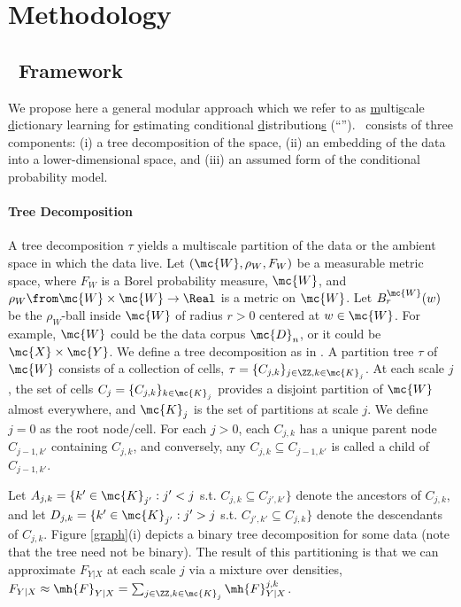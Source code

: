 \section{Methodology} \label{sec:method}

\subsection{\msd~Framework}

We propose here a general modular approach which we refer to as \uline{m}ulti\uline{s}cale \uline{d}ictionary learning for \uline{e}stimating conditional \uline{d}istribution\uline{s} (``\msd''). \msd~consists of three components: (i) a tree decomposition of the space, (ii) an embedding of the data into a lower-dimensional space,  and (iii) an assumed form of the conditional probability model. 

\paragraph{Tree Decomposition}
A tree decomposition $\tau$ yields a multiscale partition of the data or the ambient space in which the data live.
Let $(\mc{W},\rho_W, F_W)$ be a measurable metric space, where $F_W$ is a Borel probability measure, $\mc{W}$, and $\rho_W \from \mc{W} \times \mc{W} \to \Real$ is a metric on $\mc{W}$.  Let $B_r^{\mc{W}}(w)$ be the $\rho_W$-ball inside $\mc{W}$ of radius $r > 0$ centered at $w \in \mc{W}$. For example, $\mc{W}$ could be the data corpus $\mc{D}_n$, or it could be $\mc{X} \times \mc{Y}$. We define a tree decomposition as in \cite{Allard2012,ChenMaggioni12}.  A partition tree $\tau$ of $\mc{W}$ consists of a collection of cells, $\tau=\{C_{j,k}\}_{j \in \ZZ, k \in \mc{K}_j}$.  At each scale $j$, the set of cells $C_j=\{C_{j,k}\}_{k \in \mc{K}_j}$ provides a disjoint partition of $\mc{W}$ almost everywhere, and $\mc{K}_j$ is the set of partitions at scale $j$.  We define $j=0$ as the root node/cell.  For each $j > 0$,  each $C_{j,k}$ has a unique parent node $C_{j-1,k'}$ containing $C_{j,k}$, and conversely, any $C_{j,k} \subseteq C_{j-1,k'}$ is called a child of $C_{j-1,k'}$.



Let $A_{j,k}=\{k' \in \mc{K}_{j'} : j' < j$ s.t. $C_{j,k} \subseteq C_{j',k'}\}$ denote the ancestors of $C_{j,k}$, and let $D_{j,k}=\{k' \in \mc{K}_{j'} : j' > j$ s.t. $C_{j',k'} \subseteq C_{j,k}\}$ denote the descendants of $C_{j,k}$.
Figure \ref{graph}(i) depicts a binary tree decomposition for some data (note that the tree need not be binary). The result of this partitioning is that we can approximate $F_{Y|X}$ at each scale $j$ via a mixture over densities, $F_{Y|X} \approx \mh{F}_{Y|X}= \sum_{j \in \ZZ, k \in \mc{K}_j} \mh{F}^{j,k}_{Y|X}$. 

